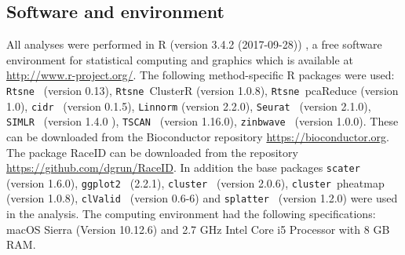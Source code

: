 \documentclass[12pt, a4paper]{article}\usepackage[]{graphicx}\usepackage[]{color}
\begin{document}
\subsection{Software and environment}
All analyses were performed in R (version 3.4.2 (2017-09-28)) \citep{R}, a free software environment for statistical computing and graphics which is available at \url{http://www.r-project.org/}. The following method-specific R packages were used: \texttt{Rtsne } (version 0.13), \texttt{Rtsne }ClusterR (version 1.0.8), \texttt{Rtsne }pcaReduce (version 1.0), \texttt{cidr } (version 0.1.5), \texttt{Linnorm} (version 2.2.0), \texttt{Seurat } (version 2.1.0), \texttt{SIMLR } (version 1.4.0 ), \texttt{TSCAN } (version 1.16.0), \texttt{zinbwave } (version 1.0.0). These can be downloaded from the Bioconductor repository \url{https://bioconductor.org}. The package RaceID can be downloaded from the repository \url{https://github.com/dgrun/RaceID}. In addition the base packages \texttt{scater } (version 1.6.0), \texttt{ggplot2 }  (2.2.1), \texttt{cluster } (version 2.0.6), \texttt{cluster }pheatmap (version 1.0.8), \texttt{clValid } (version 0.6-6) and \texttt{splatter } (version 1.2.0) were used in the analysis. The computing environment had the following specifications: macOS Sierra (Version 10.12.6) and 2.7 GHz Intel Core i5 Processor with 8 GB RAM.


\begin{table}[htbp]
  \centering
  \caption{Overview of filtering and normalisation steps by method.}
  \label{tblone}%
\end{table}%
\end{document}
